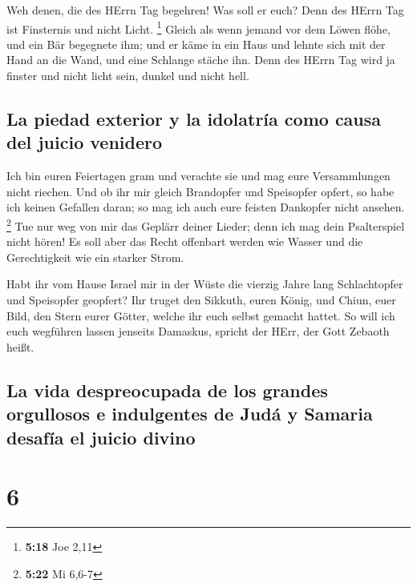  Weh denen, die des HErrn Tag begehren! Was soll er euch?
Denn des HErrn Tag ist Finsternis und nicht Licht. \footnote{\textbf{5:18}
  Joe 2,11}  Gleich als wenn jemand vor dem Löwen flöhe,
und ein Bär begegnete ihm; und er käme in ein Haus und lehnte sich mit
der Hand an die Wand, und eine Schlange stäche ihn.  Denn
des HErrn Tag wird ja finster und nicht licht sein, dunkel und nicht
hell.

\hypertarget{la-piedad-exterior-y-la-idolatruxeda-como-causa-del-juicio-venidero}{%
\subsection{La piedad exterior y la idolatría como causa del juicio
venidero}\label{la-piedad-exterior-y-la-idolatruxeda-como-causa-del-juicio-venidero}}

 Ich bin euren Feiertagen gram und verachte sie und mag
eure Versammlungen nicht riechen.  Und ob ihr mir gleich
Brandopfer und Speisopfer opfert, so habe ich keinen Gefallen daran; so
mag ich auch eure feisten Dankopfer nicht ansehen. \footnote{\textbf{5:22}
  Mi 6,6-7}  Tue nur weg von mir das Geplärr deiner
Lieder; denn ich mag dein Psalterspiel nicht hören!  Es
soll aber das Recht offenbart werden wie Wasser und die Gerechtigkeit
wie ein starker Strom.

 Habt ihr vom Hause Israel mir in der Wüste die vierzig
Jahre lang Schlachtopfer und Speisopfer geopfert?  Ihr
truget den Sikkuth, euren König, und Chiun, euer Bild, den Stern eurer
Götter, welche ihr euch selbst gemacht hattet.  So will
ich euch wegführen lassen jenseits Damaskus, spricht der HErr, der Gott
Zebaoth heißt.

\hypertarget{la-vida-despreocupada-de-los-grandes-orgullosos-e-indulgentes-de-juduxe1-y-samaria-desafuxeda-el-juicio-divino}{%
\subsection{La vida despreocupada de los grandes orgullosos e
indulgentes de Judá y Samaria desafía el juicio
divino}\label{la-vida-despreocupada-de-los-grandes-orgullosos-e-indulgentes-de-juduxe1-y-samaria-desafuxeda-el-juicio-divino}}

\hypertarget{section-5}{%
\section{6}\label{section-5}}

